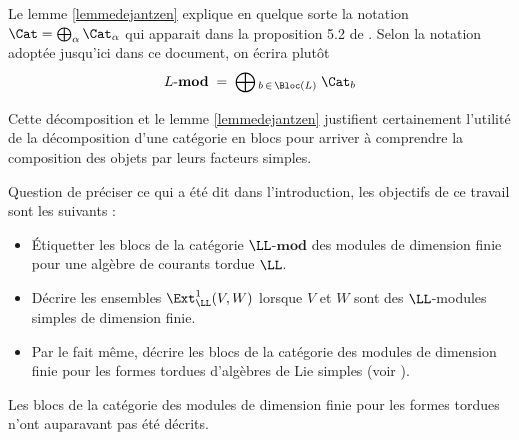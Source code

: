 Le lemme \ref{lemmedejantzen} explique en quelque sorte la notation $\Cat = \bigoplus_\alpha \Cat_\alpha$ qui apparait dans la proposition 5.2 de \cite{NSext}. Selon la notation adoptée jusqu'ici dans ce document, on écrira plutôt
\begin{equation*}
L\text{-}\mathbf{mod} \; = \; \bigoplus\textstyle{_{b \, \in \, \Bloc(L)}} \; \Cat_b
\end{equation*}

Cette décomposition et le lemme \ref{lemmedejantzen} justifient certainement l'utilité de la décomposition d'une catégorie en blocs pour arriver à comprendre la composition des objets par leurs facteurs simples. 

Question de préciser ce qui a été dit dans l'introduction, les objectifs de ce travail sont les suivants :

\begin{itemize}
\item[\textbullet] Étiquetter les blocs de la catégorie $\LL$-$\mathbf{mod}$ des modules de dimension finie pour une algèbre de courants tordue $\LL$.
\item[\textbullet] Décrire les ensembles $\Ext_\LL^1(V,W)$ lorsque $V$ et $W$ sont des $\LL$-modules simples de dimension finie.
\item[\textbullet] Par le fait même, décrire les blocs de la catégorie des modules de dimension finie pour les formes tordues d'algèbres de Lie simples (voir \cite{LPtfa}). 
\end{itemize}

\begin{Rem} Les blocs de la catégorie des modules de dimension finie pour les formes tordues n'ont auparavant pas été décrits.
\end{Rem}


